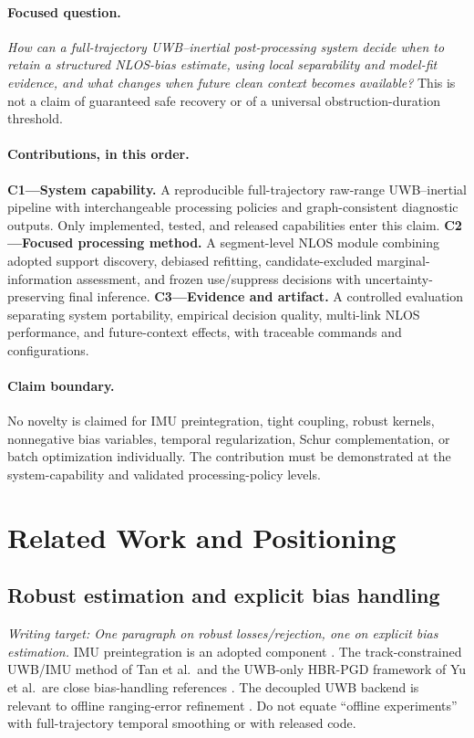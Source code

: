 \documentclass[conference]{IEEEtran}
\newcommand{\plan}[1]{\textit{Writing target: #1}}
\begin{document}
\paragraph{Focused question.}
\emph{How can a full-trajectory UWB--inertial post-processing system decide when to retain a structured NLOS-bias estimate, using local separability and model-fit evidence, and what changes when future clean context becomes available?}
This is not a claim of guaranteed safe recovery or of a universal obstruction-duration threshold.

\paragraph{Contributions, in this order.}
\textbf{C1---System capability.} A reproducible full-trajectory raw-range UWB--inertial pipeline with interchangeable processing policies and graph-consistent diagnostic outputs. Only implemented, tested, and released capabilities enter this claim.
\textbf{C2---Focused processing method.} A segment-level NLOS module combining adopted support discovery, debiased refitting, candidate-excluded marginal-information assessment, and frozen use/suppress decisions with uncertainty-preserving final inference.
\textbf{C3---Evidence and artifact.} A controlled evaluation separating system portability, empirical decision quality, multi-link NLOS performance, and future-context effects, with traceable commands and configurations.

\paragraph{Claim boundary.}
No novelty is claimed for IMU preintegration, tight coupling, robust kernels, nonnegative bias variables, temporal regularization, Schur complementation, or batch optimization individually. The contribution must be demonstrated at the system-capability and validated processing-policy levels.

\section{Related Work and Positioning}
\label{sec:related}
\subsection{Robust estimation and explicit bias handling}
\plan{One paragraph on robust losses/rejection, one on explicit bias estimation.}
IMU preintegration is an adopted component \cite{forster2015}. The track-constrained UWB/IMU method of Tan et al.\ and the UWB-only HBR-PGD framework of Yu et al.\ are close bias-handling references \cite{tan2026,yu2026}. The decoupled UWB backend is relevant to offline ranging-error refinement \cite{lu2026}. Do not equate ``offline experiments'' with full-trajectory temporal smoothing or with released code.
\end{document}

